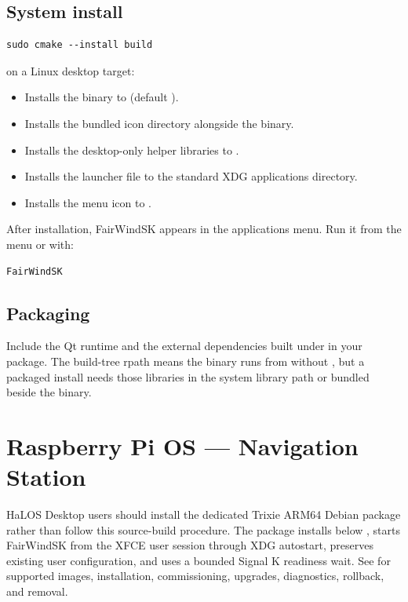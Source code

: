 \subsection{System install}

\begin{lstlisting}
sudo cmake --install build
\end{lstlisting}

 on a Linux desktop target:

\begin{itemize}
  \item Installs the  binary to
         (default ).
  \item Installs the bundled icon directory alongside the binary.
  \item Installs the desktop-only helper libraries to
        .
  \item Installs the  launcher file to the standard
        XDG applications directory.
  \item Installs the  menu icon to
        .
\end{itemize}

After installation, FairWindSK appears in the applications menu.
Run it from the menu or with:

\begin{lstlisting}
FairWindSK
\end{lstlisting}

\subsection{Packaging}

Include the Qt runtime and the external dependencies built under
 in your package.
The build-tree rpath means the binary runs from  without
, but a packaged install needs those libraries in
the system library path or bundled beside the binary.

\section{Raspberry Pi OS --- Navigation Station}

HaLOS Desktop users should install the dedicated Trixie ARM64 Debian package rather than follow this source-build procedure. The package installs below , starts FairWindSK from the XFCE user session through XDG autostart, preserves existing user configuration, and uses a bounded Signal K readiness wait. See  for supported images, installation, commissioning, upgrades, diagnostics, rollback, and removal.
\label{app:rpi-station}

